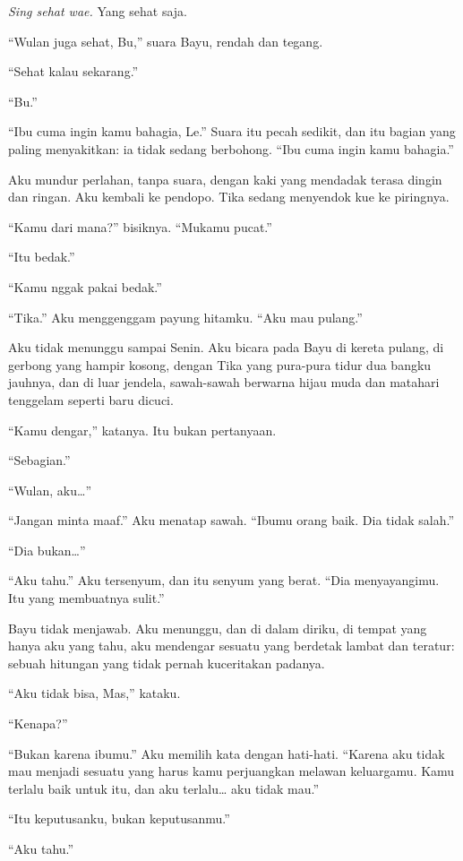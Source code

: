 \documentclass[11pt,twoside,openany]{book}
\makeatletter
\newcommand{\scenebreak}{\par\vspace{0.9em}{\centering\textsc{*\hspace{0.7em}*\hspace{0.7em}*}\par}\vspace{0.9em}\@afterindentfalse\@afterheading}
\makeatother
\begin{document}
\emph{Sing sehat wae.} Yang sehat saja.

``Wulan juga sehat, Bu,'' suara Bayu, rendah dan tegang.

``Sehat kalau sekarang.''

``Bu.''

``Ibu cuma ingin kamu bahagia, Le.'' Suara itu pecah sedikit, dan itu bagian yang paling menyakitkan: ia tidak sedang berbohong. ``Ibu cuma ingin kamu bahagia.''

Aku mundur perlahan, tanpa suara, dengan kaki yang mendadak terasa dingin dan ringan. Aku kembali ke pendopo. Tika sedang menyendok kue ke piringnya.

``Kamu dari mana?'' bisiknya. ``Mukamu pucat.''

``Itu bedak.''

``Kamu nggak pakai bedak.''

``Tika.'' Aku menggenggam payung hitamku. ``Aku mau pulang.''

\scenebreak
Aku tidak menunggu sampai Senin. Aku bicara pada Bayu di kereta pulang, di gerbong yang hampir kosong, dengan Tika yang pura-pura tidur dua bangku jauhnya, dan di luar jendela, sawah-sawah berwarna hijau muda dan matahari tenggelam seperti baru dicuci.

``Kamu dengar,'' katanya. Itu bukan pertanyaan.

``Sebagian.''

``Wulan, aku\ldots{}''

``Jangan minta maaf.'' Aku menatap sawah. ``Ibumu orang baik. Dia tidak salah.''

``Dia bukan\ldots{}''

``Aku tahu.'' Aku tersenyum, dan itu senyum yang berat. ``Dia menyayangimu. Itu yang membuatnya sulit.''

Bayu tidak menjawab. Aku menunggu, dan di dalam diriku, di tempat yang hanya aku yang tahu, aku mendengar sesuatu yang berdetak lambat dan teratur: sebuah hitungan yang tidak pernah kuceritakan padanya.

``Aku tidak bisa, Mas,'' kataku.

``Kenapa?''

``Bukan karena ibumu.'' Aku memilih kata dengan hati-hati. ``Karena aku tidak mau menjadi sesuatu yang harus kamu perjuangkan melawan keluargamu. Kamu terlalu baik untuk itu, dan aku terlalu\ldots{} aku tidak mau.''

``Itu keputusanku, bukan keputusanmu.''

``Aku tahu.''
\end{document}

